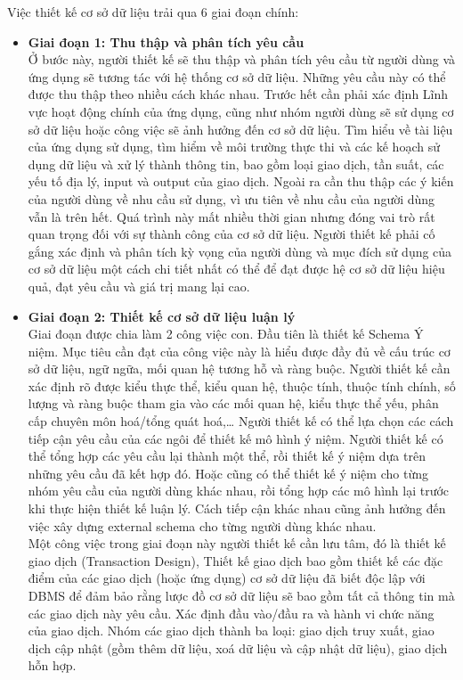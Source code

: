 \hspace*{0.5cm} Việc thiết kế cơ sở dữ liệu trải qua 6 giai đoạn chính:
\begin{itemize}
	\item \textbf{Giai đoạn 1: Thu thập và phân tích yêu cầu}\\
	\hspace*{0.5cm} Ở bước này, người thiết kế sẽ thu thập và phân tích yêu cầu từ người dùng và ứng dụng sẽ tương tác với hệ thống cơ sở dữ liệu. Những yêu cầu này có thể được thu thập theo nhiều cách khác nhau. Trước hết cần phải xác định Lĩnh vực hoạt động chính của ứng dụng, cũng như nhóm người dùng sẽ sử dụng cơ sở dữ liệu hoặc công việc sẽ ảnh hưởng đến cơ sở dữ liệu. Tìm hiểu về tài liệu của ứng dụng sử dụng, tìm hiểm về môi trường thực thi và các kế hoạch sử dụng dữ liệu và xử lý thành thông tin, bao gồm loại giao dịch, tần suất, các yếu tố địa lý, input và output của giao dịch. Ngoài ra cần thu thập các ý kiến của người dùng về nhu cầu sử dụng, vì ưu tiên về nhu cầu của người dùng vẫn là trên hết. Quá trình này mất nhiều thời gian nhưng đóng vai trò rất quan trọng đối với sự thành công của cơ sở dữ liệu. Người thiết kế phải cố gắng xác định và phân tích kỳ vọng của người dùng và mục đích sử dụng của cơ sở dữ liệu một cách chi tiết nhất có thể để đạt được hệ cơ sở dữ liệu hiệu quả, đạt yêu cầu và giá trị mang lại cao.
	\item \textbf{Giai đoạn 2: Thiết kế cơ sở dữ liệu luận lý}\\
	\hspace*{0.5cm} Giai đoạn được chia làm 2 công việc con. Đầu tiên là thiết kế Schema Ý niệm. Mục tiêu cần đạt của công việc này là hiểu được đầy đủ về cấu trúc cơ sở dữ liệu, ngữ ngữa, mối quan hệ tương hỗ và ràng buộc. Người thiết kế cần xác định rõ được kiểu thực thể, kiểu quan hệ, thuộc tính, thuộc tính chính, số lượng và ràng buộc tham gia vào các mối quan hệ, kiểu thực thể yếu, phân cấp chuyên môn hoá/tổng quát hoá,… Người thiết kế có thể lựa chọn các cách tiếp cận yêu cầu của các ngôi để thiết kế mô hình ý niệm. Người thiết kế  có thể tổng hợp các yêu cầu lại thành một thể, rồi thiết kế ý niệm dựa trên những yêu cầu đã kết hợp đó. Hoặc cũng có thể thiết kế ý niệm cho từng nhóm yêu cầu của người dùng khác nhau, rồi tổng hợp các mô hình lại trước khi thực hiện thiết kế luận lý. Cách tiếp cận khác nhau cũng ảnh hưởng đến việc xây dựng external schema cho từng người dùng khác nhau.\\
	\hspace*{0.5cm} Một công việc trong giai đoạn này người thiết kế cần lưu tâm, đó là thiết kế giao dịch (Transaction Design), Thiết kế giao dịch bao gồm thiết kế các đặc điểm của các giao dịch (hoặc ứng dụng) cơ sở dữ liệu đã biết độc lập với DBMS để đảm bảo rằng lược đồ cơ sở dữ liệu sẽ bao gồm tất cả thông tin mà các giao dịch này yêu cầu. Xác định đầu vào/đầu ra và hành vi chức năng của giao dịch. Nhóm các giao dịch thành ba loại: giao dịch truy xuất, giao dịch cập nhật (gồm thêm dữ liệu, xoá dữ liệu và cập nhật dữ liệu), giao dịch hỗn hợp.

\end{itemize}
